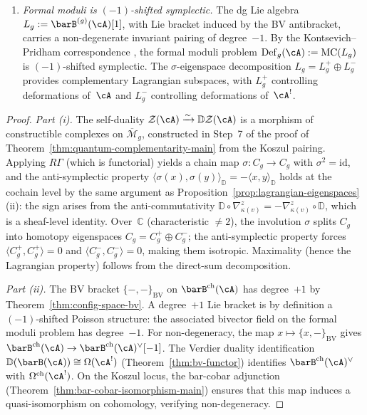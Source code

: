 \begin{theorem}
\begin{enumerate}[label=\textup{(\roman*)}]
\item \emph{Formal moduli is $(-1)$-shifted symplectic.}
  The dg Lie algebra $L_g := \barB^{(g)}(\cA)[1]$, with Lie bracket
  induced by the BV antibracket, carries a non-degenerate invariant
  pairing of degree~$-1$.  By the Kontsevich--Pridham correspondence
  \cite{Pridham17}, the formal moduli problem
  $\mathrm{Def}_g(\cA) := \mathrm{MC}(L_g)$
  is $(-1)$-shifted symplectic.  The $\sigma$-eigenspace decomposition
  $L_g = L_g^+ \oplus L_g^-$ provides complementary Lagrangian
  subspaces, with $L_g^+$ controlling deformations of~$\cA$ and
  $L_g^-$ controlling deformations of~$\cA^!$.
\end{enumerate}
\end{theorem}

\begin{proof}
\emph{Part (i).}
The self-duality
$\mathcal{Z}(\cA) \xrightarrow{\sim} \mathbb{D}\mathcal{Z}(\cA)$
is a morphism of constructible complexes on $\overline{\mathcal{M}}_g$,
constructed in Step~7 of the proof of
Theorem~\ref{thm:quantum-complementarity-main} from the Koszul pairing.
Applying $R\Gamma$ (which is functorial) yields a chain map
$\sigma \colon C_g \to C_g$ with $\sigma^2 = \mathrm{id}$, and the
anti-symplectic property
$\langle \sigma(x), \sigma(y) \rangle_{\mathbb{D}}
= -\langle x, y \rangle_{\mathbb{D}}$
holds at the cochain level by the same argument as
Proposition~\ref{prop:lagrangian-eigenspaces}(ii): the sign arises
from the anti-commutativity
$\mathbb{D} \circ \nabla_{\kappa(v)}^z
= -\nabla_{\kappa(v)}^z \circ \mathbb{D}$,
which is a sheaf-level identity.  Over~$\mathbb{C}$ (characteristic
$\neq 2$), the involution $\sigma$ splits $C_g$ into homotopy
eigenspaces $C_g = C_g^+ \oplus C_g^-$; the anti-symplectic property
forces $\langle C_g^+, C_g^+ \rangle = 0$ and
$\langle C_g^-, C_g^- \rangle = 0$, making them isotropic.
Maximality (hence the Lagrangian property) follows from the
direct-sum decomposition.

\emph{Part (ii).}
The BV bracket $\{-,-\}_{\mathrm{BV}}$ on $\barB^{\mathrm{ch}}(\cA)$
has degree~$+1$ by Theorem~\ref{thm:config-space-bv}.  A degree~$+1$
Lie bracket is by definition a $(-1)$-shifted Poisson structure: the
associated bivector field on the formal moduli problem has degree~$-1$.
For non-degeneracy, the map
$x \mapsto \{x, -\}_{\mathrm{BV}}$
gives $\barB^{\mathrm{ch}}(\cA) \to
\barB^{\mathrm{ch}}(\cA)^{\vee}[-1]$.
The Verdier duality identification
$\mathbb{D}(\barB(\cA)) \cong \Omega(\cA^!)$
(Theorem~\ref{thm:bv-functor}) identifies
$\barB^{\mathrm{ch}}(\cA)^{\vee}$ with $\Omega^{\mathrm{ch}}(\cA^!)$.
On the Koszul locus, the bar-cobar adjunction
(Theorem~\ref{thm:bar-cobar-isomorphism-main}) ensures that this
map induces a quasi-isomorphism on cohomology, verifying
non-degeneracy.


\end{proof}
